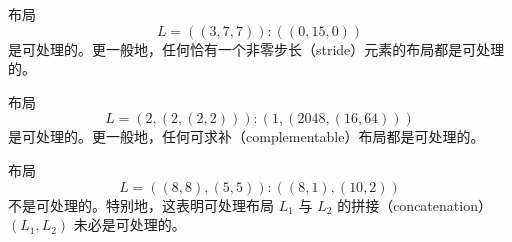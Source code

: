 \begin{example}
    布局
    \[L = ((3,7,7)):((0,15,0))\]
    是可处理的。更一般地，任何恰有一个非零步长（stride）元素的布局都是可处理的。
\end{example}

\begin{example}
    布局
    \[L = (2,(2,(2,2))):(1,(2048,(16,64)))\]
    是可处理的。更一般地，任何可求补（complementable）布局都是可处理的。
\end{example}


\begin{example}
    布局
    \[L = ((8,8),(5,5)):((8,1),(10,2))\]
    不是可处理的。特别地，这表明可处理布局 $L_1$ 与 $L_2$ 的拼接（concatenation）$(L_1,L_2)$ 未必是可处理的。
\end{example}


